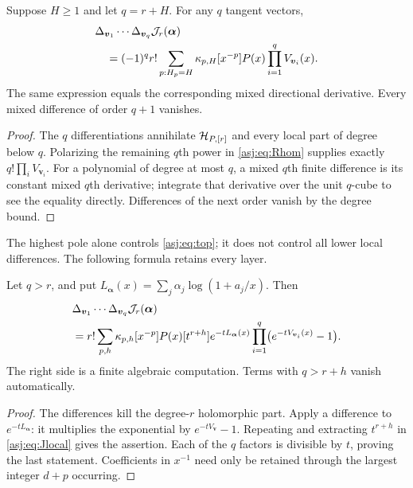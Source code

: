 \begin{theorem}\label{asj:thm:top}
Suppose $H\ge1$ and let $q=r+H$. For any $q$ tangent vectors,
\begin{align}\label{asj:eq:top}
 &\Delta_{\boldsymbol v_1}\cdots\Delta_{\boldsymbol v_q}
          \mathcal J_r(\boldsymbol\alpha)\notag\\
 &\quad=(-1)^q r!\sum_{p:H_p=H}\kappa_{p,H}
           [x^{-p}]P(x)\prod_{i=1}^q V_{\boldsymbol v_i}(x).
\end{align}
The same expression equals the corresponding mixed directional
derivative. Every mixed difference of order $q+1$ vanishes.
\end{theorem}
\begin{proof}
The $q$ differentiations annihilate $\mathcal H_{P,[r]}$ and every local
part of degree below $q$. Polarizing the remaining $q$th power in
\eqref{asj:eq:Rhom} supplies exactly $q!\prod_i V_{\boldsymbol v_i}$.
For a polynomial of degree at most $q$, a mixed $q$th finite difference
is its constant mixed $q$th derivative; integrate that derivative over
the unit $q$-cube to see the equality directly. Differences of the
next order vanish by the degree bound.
\end{proof}

The highest pole alone controls \eqref{asj:eq:top}; it does not control
all lower local differences. The following formula retains every layer.

\begin{theorem}\label{asj:thm:all-differences}
Let $q>r$, and put $L_{\boldsymbol\alpha}(x)=
\sum_j\alpha_j\log(1+a_j/x)$. Then
\begin{align}\label{asj:eq:all-differences}
 &\Delta_{\boldsymbol v_1}\cdots\Delta_{\boldsymbol v_q}
       \mathcal J_r(\boldsymbol\alpha)\notag\\
 &=r!\sum_{p,h}\kappa_{p,h}[x^{-p}]P(x)
      [t^{r+h}]e^{-tL_{\boldsymbol\alpha}(x)}
            \prod_{i=1}^q\bigl(e^{-tV_{\boldsymbol v_i}(x)}-1\bigr).
\end{align}
The right side is a finite algebraic computation. Terms with $q>r+h$
vanish automatically.
\end{theorem}
\begin{proof}
The differences kill the degree-$r$ holomorphic part. Apply a difference
to $e^{-tL_{\boldsymbol\alpha}}$: it multiplies the exponential by
$e^{-tV_{\boldsymbol v}}-1$. Repeating and extracting $t^{r+h}$ in
\eqref{asj:eq:Jlocal} gives the assertion. Each of the $q$ factors is
divisible by $t$, proving the last statement. Coefficients in $x^{-1}$
need only be retained through the largest integer $d+p$ occurring.
\end{proof}

